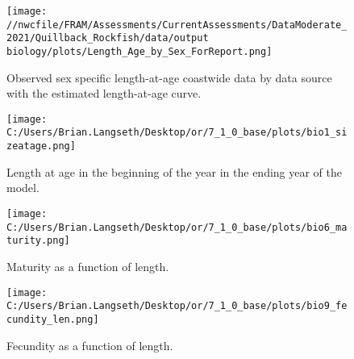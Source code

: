\documentclass[11pt,
  english,
  a4paper,
]{article}
\begin{document}
\tagmcend\tagstructend


\begin{figure}
\centering
\texttt{[image: //nwcfile/FRAM/Assessments/CurrentAssessments/DataModerate\_2021/Quillback\_Rockfish/data/output biology/plots/Length\_Age\_by\_Sex\_ForReport.png]}
\caption{Observed sex specific length-at-age coastwide data by data source with the estimated length-at-age curve.\label{fig:len-age-data}}
\end{figure}

\tagmcend\tagstructend


\begin{figure}
\centering
\texttt{[image: C:/Users/Brian.Langseth/Desktop/or/7\_1\_0\_base/plots/bio1\_sizeatage.png]}
\caption{Length at age in the beginning of the year in the ending year of the model.\label{fig:len-age-ss}}
\end{figure}

\tagmcend\tagstructend


\begin{figure}
\centering
\texttt{[image: C:/Users/Brian.Langseth/Desktop/or/7\_1\_0\_base/plots/bio6\_maturity.png]}
\caption{Maturity as a function of length.\label{fig:maturity}}
\end{figure}

\tagmcend\tagstructend


\begin{figure}
\centering
\texttt{[image: C:/Users/Brian.Langseth/Desktop/or/7\_1\_0\_base/plots/bio9\_fecundity\_len.png]}
\caption{Fecundity as a function of length.\label{fig:fecundity}}
\end{figure}

\tagmcend\tagstructend

\end{document}
